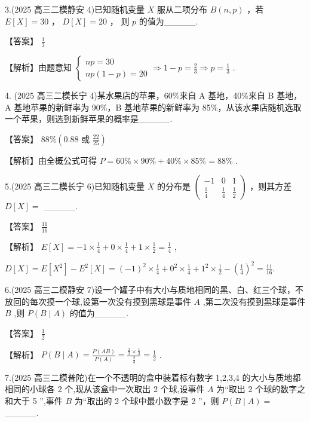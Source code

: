 \documentclass[10pt]{article}
\begin{document}
3.(2025 高三二模静安 4)已知随机变量 \(X\) 服从二项分布 \(B\left( {n,p}\right)\) ，若 \(E\left\lbrack  X\right\rbrack   = {30}\) ， \(D\left\lbrack  X\right\rbrack   = {20}\) ， 则 \(p\) 的值为\_\_\_\_\_.

【答案】 \(\frac{1}{3}\)

【解析】由题意知 \(\left\{  {\begin{array}{l} {np} = {30} \\  {np}\left( {1 - p}\right)  = {20} \end{array} \Rightarrow  1 - p = \frac{2}{3} \Rightarrow  p = \frac{1}{3}}\right.\) .

4. (2025 高三二模长宁 4)某水果店的苹果，60\%来自 A 基地，40\%来自 B 基地，A 基地苹果的新鲜率为 90\%，B 基地苹果的新鲜率为 85\%，从该水果店随机选取一个苹果，则选到新鲜苹果的概率是\_\_\_\_\_.

【答案】 \({88}\% \left( {{0.88}\text{ 或 }\frac{22}{25}}\right)\)

【解析】由全概公式可得 \(P = {60}\%  \times  {90}\%  + {40}\%  \times  {85}\%  = {88}\%\) .

5.(2025 高三二模长宁 6)已知随机变量 \(X\) 的分布是 \(\left( \begin{matrix}  - 1 & 0 & 1 \\  \frac{1}{4} & \frac{1}{4} & \frac{1}{2} \end{matrix}\right)\) ，则其方差 \(D\left\lbrack  X\right\rbrack   =\) \_\_\_\_\_.

【答案】 \(\frac{11}{16}\)

【解析】 \(E\left\lbrack  X\right\rbrack   =  - 1 \times  \frac{1}{4} + 0 \times  \frac{1}{4} + 1 \times  \frac{1}{2} = \frac{1}{4}\) ,

\(D\left\lbrack  X\right\rbrack   = E\left\lbrack  {X}^{2}\right\rbrack   - {E}^{2}\left\lbrack  X\right\rbrack   = {\left( -1\right) }^{2} \times  \frac{1}{4} + {0}^{2} \times  \frac{1}{4} + {1}^{2} \times  \frac{1}{2} - {\left( \frac{1}{4}\right) }^{2} = \frac{11}{16}.\)

6.(2025 高三二模静安 7)设一个罐子中有大小与质地相同的黑、白、红三个球，不放回的每次摸一个球,设第一次没有摸到黑球是事件 \(A\) ,第二次没有摸到黑球是事件 \(B\) ,则 \(P\left( {B \mid  A}\right)\) 的值为\_\_\_\_\_.

【答案】 \(\frac{1}{2}\)

【解析】 \(P\left( {B \mid  A}\right)  = \frac{P\left( {AB}\right) }{P\left( A\right) } = \frac{\frac{2}{3} \times  \frac{1}{2}}{\frac{2}{3}} = \frac{1}{2}\) .

7.(2025 高三二模普陀)在一个不透明的盒中装着标有数字 1,2,3,4 的大小与质地都相同的小球各 2 个,现从该盒中一次取出 2 个球,设事件 \(A\) 为“取出 2 个球的数字之和大于 5 ”,事件 \(B\) 为“取出的 2 个球中最小数字是 2 ”，则 \(P\left( {B \mid  A}\right)  =\) \_\_\_\_\_.
\end{document}

